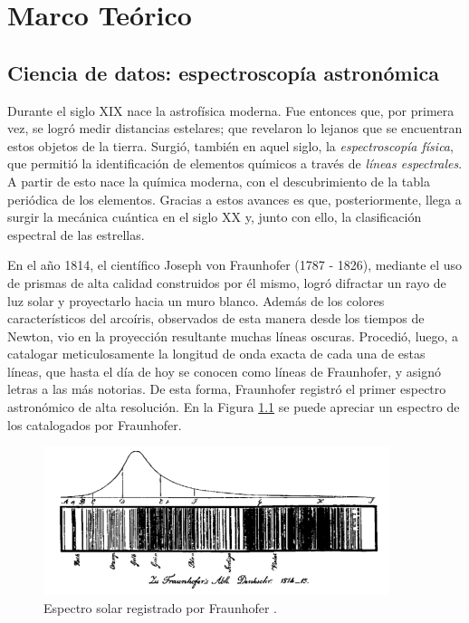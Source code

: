 \chapter{Marco Teórico}


\section{Ciencia de datos: espectroscopía astronómica}

Durante el siglo XIX nace la astrofísica moderna. Fue entonces que, por primera vez, se logró medir distancias estelares; que revelaron lo lejanos que se encuentran estos objetos de la tierra. Surgió, también en aquel siglo, la \textit{espectroscopía física}, que permitió la identificación de elementos químicos a través de \textit{líneas espectrales}. A partir de esto nace la química moderna, con el descubrimiento de la tabla periódica de los elementos. Gracias a estos avances es que, posteriormente, llega a surgir la mecánica cuántica en el siglo XX y, junto con ello, la clasificación espectral de las estrellas.

En el año 1814, el científico Joseph von Fraunhofer (1787 - 1826), mediante el uso de prismas de alta calidad construidos por él mismo, logró difractar un rayo de luz solar y proyectarlo hacia un muro blanco. Además de los colores característicos del arcoíris, observados de esta manera desde los tiempos de Newton, vio en la proyección resultante muchas líneas oscuras. Procedió, luego, a catalogar meticulosamente la longitud de onda exacta de cada una de estas líneas, que hasta el día de hoy se conocen como líneas de Fraunhofer, y asignó letras a las más notorias. De esta forma, Fraunhofer registró el primer espectro astronómico de alta resolución. En la Figura \ref{fig:fraunhofer_sun} se puede apreciar un espectro de los catalogados por Fraunhofer.

\begin{figure}[h!]
\begin{center}
\includegraphics[width=0.9\textwidth]{imagenes/fraunhofer_sun.png}
\end{center}
\vspace*{-5mm}
\caption{Espectro solar registrado por Fraunhofer \cite{tennyson2010astronomical}.}
\label{fig:fraunhofer_sun}
\end{figure}

